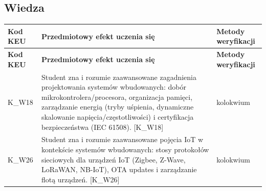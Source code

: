 \documentclass[12pt, a4paper]{article}
\newcommand{\thdrule}{\noalign{\global\setlength{\extrarowheight}{0pt}}}
\newcommand{\thdend}{\noalign{\global\setlength{\extrarowheight}{3pt}}}
\begin{document}
\subsection*{Wiedza}
{\scriptsize
\begin{longtable}{m{1.6cm}m{9.0cm}m{4.2cm}}
\thdrule\toprule
\rowcolor{pjatkRed} {\color{white}\footnotesize\textbf{\vphantom{Ag}Kod KEU}} & {\color{white}\footnotesize\textbf{\vphantom{Ag}Przedmiotowy efekt uczenia się}} & {\color{white}\footnotesize\textbf{\vphantom{Ag}Metody weryfikacji}} \\
\midrule\thdend
\endfirsthead
\thdrule\toprule
\rowcolor{pjatkRed} {\color{white}\footnotesize\textbf{\vphantom{Ag}Kod KEU}} & {\color{white}\footnotesize\textbf{\vphantom{Ag}Przedmiotowy efekt uczenia się}} & {\color{white}\footnotesize\textbf{\vphantom{Ag}Metody weryfikacji}} \\
\midrule\thdend
\endhead
  \rowcolor{tableRowLight} K\_W18 & Student zna i rozumie zaawansowane zagadnienia projektowania systemów wbudowanych: dobór mikrokontrolera/procesora, organizacja pamięci, zarządzanie energią (tryby uśpienia, dynamiczne skalowanie napięcia/częstotliwości) i certyfikacja bezpieczeństwa (IEC 61508). {[}K\_W18{]} & kolokwium \\
  \rowcolor{tableRowAlt} K\_W26 & Student zna i rozumie zaawansowane pojęcia IoT w kontekście systemów wbudowanych: stosy protokołów sieciowych dla urządzeń IoT (Zigbee, Z-Wave, LoRaWAN, NB-IoT), OTA updates i zarządzanie flotą urządzeń. {[}K\_W26{]} & kolokwium \\
\bottomrule
\end{longtable}}
\end{document}
